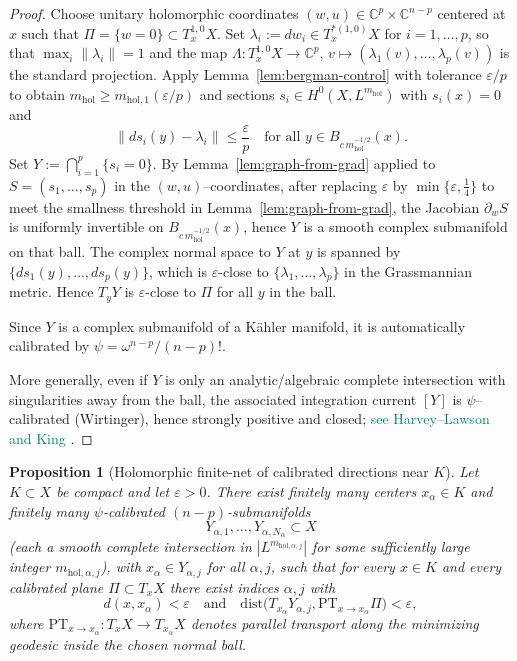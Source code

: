 \documentclass[11pt]{article}
\newcommand{\REVMZ}[1]{\textcolor{teal}{#1}}  %
\numberwithin{equation}{section}  %
\theoremstyle{plain}
\newtheorem{proposition}[theorem]{Proposition}
\theoremstyle{definition}
\theoremstyle{remark}
\newcommand{\C}{\mathbb{C}}
\newcommand{\mhol}{m_{\mathrm{hol}}} %
\newcommand{\dist}{\mathrm{dist}}
\begin{document}
\begin{proof}
Choose unitary holomorphic coordinates $(w,u)\in\C^p\times\C^{n-p}$ centered at $x$ such that
$\Pi=\{w=0\}\subset T_x^{1,0}X$.  Set $\lambda_i:=dw_i\in T_x^{*(1,0)}X$ for $i=1,\dots,p$, so that
$\max_i\|\lambda_i\|=1$ and the map $\Lambda:T_x^{1,0}X\to\C^p$, $v\mapsto(\lambda_1(v),\dots,\lambda_p(v))$ is
the standard projection.
Apply Lemma~\ref{lem:bergman-control} with tolerance $\varepsilon/p$ to obtain
$\mhol\ge m_{\mathrm{hol},1}(\varepsilon/p)$ and sections $s_i\in H^0(X,L^{\mhol})$ with $s_i(x)=0$ and
\[
\|ds_i(y)-\lambda_i\|\le \frac{\varepsilon}{p}
\quad\text{for all } y\in B_{c\,\mhol^{-1/2}}(x).
\]
Set $Y:=\bigcap_{i=1}^p\{s_i=0\}$.
By Lemma~\ref{lem:graph-from-grad} applied to $S=(s_1,\dots,s_p)$ in the $(w,u)$--coordinates, after replacing $\varepsilon$ by $\min\{\varepsilon,\tfrac14\}$ to meet the smallness threshold in Lemma~\ref{lem:graph-from-grad}, the Jacobian $\partial_w S$ is uniformly invertible on $B_{c\,\mhol^{-1/2}}(x)$, hence $Y$ is a smooth complex submanifold on that ball.
The complex normal space to $Y$ at $y$ is spanned by
$\{ds_1(y),\ldots,ds_p(y)\}$, which is $\varepsilon$-close to
$\{\lambda_1,\ldots,\lambda_p\}$ in the Grassmannian metric.
Hence $T_yY$ is $\varepsilon$-close to $\Pi$ for all $y$ in the ball.

Since $Y$ is a complex submanifold of a K\"ahler manifold, it is
automatically calibrated by $\psi=\omega^{n-p}/(n-p)!$.

More generally, even if $Y$ is only an analytic/algebraic complete intersection with singularities away from the ball,
the associated integration current $[Y]$ is $\psi$--calibrated (Wirtinger), hence strongly positive and closed; \REVMZ{see Harvey--Lawson \cite[Thm~4.2]{HL82} and King \cite[Thm~4.5]{King71}}.


\end{proof}
\begin{proposition}[Holomorphic finite-net of calibrated directions near $K$]
\label{prop:dense-holo}
{%
Let $K\subset X$ be compact and let $\varepsilon>0$.
There exist finitely many centers $x_\alpha\in K$ and finitely many $\psi$-calibrated
$(n-p)$-submanifolds
\[
Y_{\alpha,1},\ldots,Y_{\alpha,N_\alpha}\subset X
\]
{(each a smooth complete intersection in $|L^{m_{\mathrm{hol},\alpha,j}}|$ for some sufficiently large integer $m_{\mathrm{hol},\alpha,j}$),}
with $x_\alpha\in Y_{\alpha,j}$ for all $\alpha,j$, such that for every $x\in K$ and every calibrated plane
$\Pi\subset T_xX$ there exist indices $\alpha,j$ with
\[
d(x,x_\alpha)<\varepsilon
\quad\text{and}\quad
\dist\!\bigl(T_{x_\alpha}Y_{\alpha,j},\mathrm{PT}_{x\to x_\alpha}\Pi\bigr)<\varepsilon,
\]
where $\mathrm{PT}_{x\to x_\alpha}:T_xX\to T_{x_\alpha}X$ denotes parallel transport along the minimizing geodesic
inside the chosen normal ball.
}%
\end{proposition}
\end{document}
